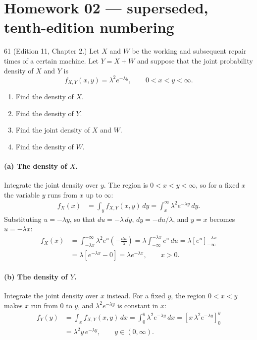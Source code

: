 \documentclass[11pt]{article}
\begin{document}
\section*{Homework 02 --- superseded, tenth-edition numbering}

\begin{problem}{61}
  (Edition 11, Chapter 2.) Let $X$ and $W$ be the working and subsequent
  repair times of a certain machine. Let $Y = X + W$ and suppose that the
  joint probability density of $X$ and $Y$ is
  \[
    f_{X,Y}(x,y) = \lambda^2 e^{-\lambda y}, \qquad 0 < x < y < \infty.
  \]
  \begin{enumerate}
    \item Find the density of $X$.
    \item Find the density of $Y$.
    \item Find the joint density of $X$ and $W$.
    \item Find the density of $W$.
  \end{enumerate}
\end{problem}
\paragraph{(a) The density of $X$.}
Integrate the joint density over $y$. The region is $0 < x < y < \infty$, so for a fixed
$x$ the variable $y$ runs from $x$ up to $\infty$:
\begin{align*}
  f_{X}(x) &= \int_{y} f_{X,Y}(x,y)\,dy
            = \int_{x}^{\infty} \lambda^{2} e^{-\lambda y}\,dy .
\end{align*}
Substituting $u = -\lambda y$, so that $du = -\lambda\,dy$, $dy = -du/\lambda$, and
$y = x$ becomes $u = -\lambda x$:
\begin{align*}
  f_{X}(x) &= \int_{-\lambda x}^{-\infty} \lambda^{2} e^{u}\left(-\frac{du}{\lambda}\right)
            = \lambda \int_{-\infty}^{-\lambda x} e^{u}\,du
            = \lambda\left[e^{u}\right]_{-\infty}^{-\lambda x}\\
           &= \lambda\left[e^{-\lambda x} - 0\right]
            = \boxed{\lambda e^{-\lambda x}}, \qquad x > 0 .
\end{align*}

\paragraph{(b) The density of $Y$.}
Integrate the joint density over $x$ instead. For a fixed $y$, the region
$0 < x < y$ makes $x$ run from $0$ to $y$, and $\lambda^{2}e^{-\lambda y}$ is constant
in $x$:
\begin{align*}
  f_{Y}(y) &= \int_{x} f_{X,Y}(x,y)\,dx
            = \int_{0}^{y} \lambda^{2} e^{-\lambda y}\,dx
            = \left[x\,\lambda^{2} e^{-\lambda y}\right]_{0}^{y}\\
           &= \boxed{\lambda^{2} y\, e^{-\lambda y}}, \qquad y \in (0,\infty).
\end{align*}
\end{document}
